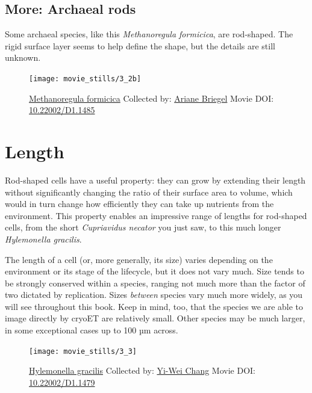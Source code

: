 \documentclass[]{tufte-book}
\begin{document}
\hypertarget{Archaeal_rods}{\subsection*{More: Archaeal
rods}\label{Archaeal_rods}}

Some archaeal species, like this \emph{Methanoregula formicica}, are
rod-shaped. The rigid surface layer seems to help define the shape, but
the details are still unknown.





\begin{figure}
\texttt{[image: movie\_stills/3\_2b]} \caption[\protect\hyperlink{tree}{Methanoregula formicica} Collected
by: \protect\hyperlink{ariane_briegel}{Ariane Briegel} Movie DOI:
\href{https://doi.org/10.22002/D1.1485}{10.22002/D1.1485}]{\protect\hyperlink{tree}{Methanoregula formicica} Collected
by: \protect\hyperlink{ariane_briegel}{Ariane Briegel} Movie DOI:
\href{https://doi.org/10.22002/D1.1485}{10.22002/D1.1485}}\label{fig:3-2b}
\end{figure}

\section{Length}\label{length}

Rod-shaped cells have a useful property: they can grow by extending
their length without significantly changing the ratio of their surface
area to volume, which would in turn change how efficiently they can take
up nutrients from the environment. This property enables an impressive
range of lengths for rod-shaped cells, from the short \emph{Cupriavidus
necator} you just saw, to this much longer \emph{Hylemonella gracilis}.

The length of a cell (or, more generally, its size) varies depending on
the environment or its stage of the lifecycle, but it does not vary
much. Size tends to be strongly conserved within a species, ranging not
much more than the factor of two dictated by replication. Sizes
\emph{between} species vary much more widely, as you will see throughout
this book. Keep in mind, too, that the species we are able to image
directly by cryoET are relatively small. Other species may be much
larger, in some exceptional cases up to 100 µm across.





\begin{figure}
\texttt{[image: movie\_stills/3\_3]} \caption[\protect\hyperlink{tree}{Hylemonella gracilis} Collected by:
\protect\hyperlink{yi-wei_chang}{Yi-Wei Chang} Movie DOI:
\href{https://doi.org/10.22002/D1.1479}{10.22002/D1.1479}]{\protect\hyperlink{tree}{Hylemonella gracilis} Collected by:
\protect\hyperlink{yi-wei_chang}{Yi-Wei Chang} Movie DOI:
\href{https://doi.org/10.22002/D1.1479}{10.22002/D1.1479}}\label{fig:3-3}
\end{figure}
\end{document}

